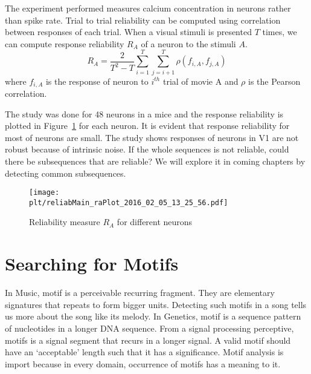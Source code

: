 \documentclass[MTech]{iitmdiss}
\newcommand{\plt}{thesis_plots}
\begin{document}
The experiment performed measures calcium concentration in neurons rather than spike rate. Trial to trial reliability can be computed using correlation between responses of each trial. When a visual stimuli is presented $T$ times, we can compute response reliability $R_A$ of a neuron to the stimuli $A$.
$$R_A = \frac{2}{T^2 - T}\sum_{i=1}^T \sum_{j=i+1}^T \rho(f_{i, A}, f_{j, A})$$
where $f_{i, A}$ is the response of neuron to $i^{th}$ trial of movie A and $\rho$ is the Pearson correlation.

The study was done for 48 neurons in a mice and the response reliability is plotted in Figure~\ref{img:ra} for each neuron. It is evident that response reliability for most of neurons are small. The study shows responses of neurons in V1 are not robust because of intrinsic noise. If the whole sequences is not reliable, could there be subsequences that are reliable? We will explore it in coming chapters by detecting common subsequences.
\begin{figure}
    \centering
    \texttt{[image: \\plt/reliabMain\_raPlot\_2016\_02\_05\_13\_25\_56.pdf]}
    \caption{Reliability measure $R_A$ for different neurons}
    \label{img:ra}
\end{figure} 
\chapter{Searching for Motifs}       %
\label{chap:searchmotif}
In Music, motif is a perceivable recurring fragment. They are elementary signatures that repeats to form bigger units. Detecting such motifs in a song tells us more about the song like its melody. In Genetics, motif is a sequence pattern of nucleotides in a longer DNA sequence. From a signal processing perceptive, motifs is a signal segment that recurs in a longer signal. A valid motif should have an `acceptable' length such that it has a significance. Motif analysis is import because in every domain, occurrence of motifs has a meaning to it.
\end{document}

